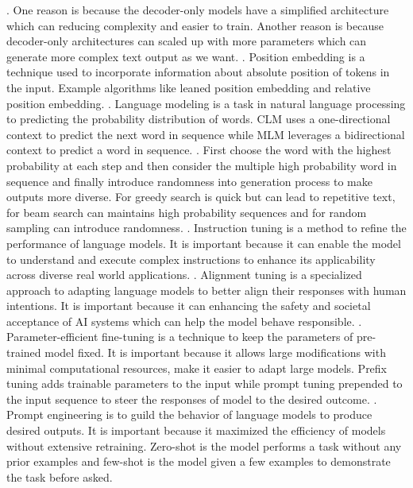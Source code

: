 {. One reason is because the decoder-only models have a simplified architecture which can reducing complexity and easier to train. Another reason is because decoder-only architectures can scaled up with more parameters which can generate more complex text output as we want.
. Position embedding is a technique used to incorporate information about absolute position of tokens in the input. Example algorithms like leaned position embedding and relative position embedding.
. Language modeling is a task in natural language processing to predicting the probability distribution of words. CLM uses a one-directional context to predict the next word in sequence while MLM leverages a bidirectional context to predict a word in sequence.
. First choose the word with the highest probability at each step and then consider the multiple high probability word in sequence and finally introduce randomness into generation process to make outputs more diverse. For greedy search is quick but can lead to repetitive text, for beam search can maintains high probability sequences and for random sampling can introduce randomness.
. Instruction tuning is a method to refine the performance of language models. It is important because it can enable the model to understand and execute complex instructions to enhance its applicability across diverse real world applications.
. Alignment tuning is a specialized approach to adapting language models to better align their responses with human intentions. It is important because it can enhancing the safety and societal acceptance of AI systems which can help the model behave responsible.
. Parameter-efficient fine-tuning is a technique to keep the parameters of pre-trained model fixed. It is important because it allows large modifications with minimal computational resources, make it easier to adapt large models. Prefix tuning adds trainable parameters to the input while prompt tuning prepended to the input sequence to steer the responses of model to the desired outcome.
. Prompt engineering is to guild the behavior of language models to produce desired outputs. It is important because it maximized the efficiency of models without extensive retraining. Zero-shot is the model performs a task without any prior examples and few-shot is the model given a few examples to demonstrate the task before asked.
}
